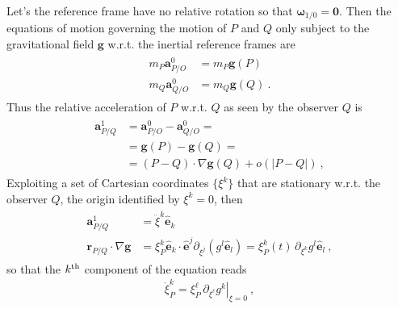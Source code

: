\documentclass[letterpaper,10pt,english]{jupyterBook}
\begin{document}
\sphinxAtStartPar
Let’s the reference frame have no relative rotation so that \(\boldsymbol\omega_{1/0} = \mathbf{0}\). Then the equations of motion governing the motion of \(P\) and \(Q\) only subject to the gravitational field \(\mathbf{g}\) w.r.t. the inertial reference frames are
\begin{equation*}
\begin{split}\begin{aligned}
  m_P \mathbf{a}^0_{P/O} & = m_P \mathbf{g}\left( P \right) \\
  m_Q \mathbf{a}^0_{Q/O} & = m_Q \mathbf{g}\left( Q \right) \ .
\end{aligned}\end{split}
\end{equation*}
\sphinxAtStartPar
Thus the relative acceleration of \(P\) w.r.t. \(Q\) as seen by the observer \(Q\) is
\begin{equation*}
\begin{split}\begin{aligned}
  \mathbf{a}^1_{P/Q} 
  & = \mathbf{a}^0_{P/O} - \mathbf{a}^0_{Q/O} = \\
  & = \mathbf{g}(P) - \mathbf{g}(Q) = \\
  & = \left( P - Q \right) \cdot \nabla \mathbf{g}(Q) + o(|P-Q|) \ ,
\end{aligned}\end{split}
\end{equation*}
\sphinxAtStartPar
{} Exploiting a set of Cartesian coordinates \(\{ \xi^k \}\) that are stationary w.r.t. the observer \(Q\), the origin identified by \(\xi^k = 0\), then
\begin{equation*}
\begin{split}\begin{aligned}
  \mathbf{a}^1_{P/Q} & = \ddot{\xi}^k \hat{\mathbf{e}}_k \\
  \mathbf{r}_{P/Q} \cdot \nabla \mathbf{g} & = \xi^k_P \hat{\mathbf{e}}_k \cdot \hat{\mathbf{e}}^j \partial_{\xi^j} \left( g^l \hat{\mathbf{e}}_l \right) = \xi^k_P(t) \, \partial_{\xi^k} g^l \hat{\mathbf{e}}_l \ ,
\end{aligned}\end{split}
\end{equation*}
\sphinxAtStartPar
so that the \(k^{\rm th}\) component of the equation reads
\begin{equation*}
\begin{split}\ddot{\xi}^k_P = \xi^\ell_P \, \partial_{\xi^\ell} \left. g^k\right|_{\xi=0} \ ,\end{split}
\end{equation*}
\end{document}

